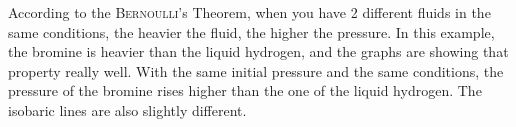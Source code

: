 According to the \textsc{Bernoulli}'s Theorem, when you have
2 different fluids in the same conditions, the heavier the fluid, the higher
the pressure. In this example, the bromine is heavier than the liquid hydrogen,
and the graphs are showing that property really well. With the same initial
pressure and the same conditions, the pressure of the bromine rises higher than
the one of the liquid hydrogen. The isobaric lines are also slightly
different.

\newpage
\begin{multicols}{2}
    [\center{\printbibheading}]
    \printbibliography[heading=none]
\end{multicols}
